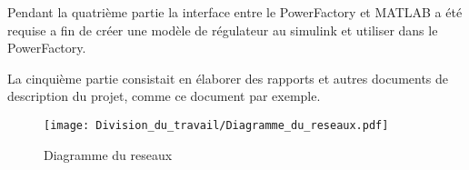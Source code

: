 	Pendant la quatrième partie la interface entre le PowerFactory et MATLAB a été requise a fin de créer une modèle de régulateur au simulink et utiliser dans le PowerFactory. 
\pagebreak

La cinquième partie consistait en élaborer des rapports et autres documents de description du projet, comme ce document par exemple.

\begin{figure}[H]
	\begin{center}	
		\texttt{[image: Division\_du\_travail/Diagramme\_du\_reseaux.pdf]}
		\caption{Diagramme du reseaux}
		\label{fig:Diagramme_du_reseaux}
	\end{center}
\end{figure}
\newpage